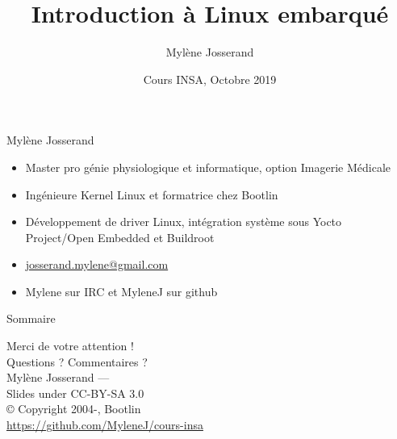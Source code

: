 \documentclass[aspectratio=169,obeyspaces,spaces,hyphens,dvipsnames]{beamer}
\title{Introduction à Linux embarqué}
\author[Mylène Josserand]
{Mylène Josserand}
\date[Octobre 2019]
{Cours INSA, Octobre 2019}
\institute[Bootlin]
\begin{document}
\begin{frame}
  \titlepage
\end{frame}

\begin{frame}{Mylène Josserand}
  \begin{itemize}
  \item Master pro génie physiologique et informatique, option Imagerie Médicale
  \item Ingénieure Kernel Linux et formatrice chez Bootlin
  \item Développement de driver Linux, intégration système sous Yocto Project/Open Embedded et Buildroot
  \item \url{josserand.mylene@gmail.com}
  \item Mylene sur IRC et MyleneJ sur github
  \end{itemize}
\end{frame}

\begin{frame}{Sommaire}
  \hspace{5cm}\tableofcontents
\end{frame}




\begin{frame}
  \begin{center}
    \Huge
    Merci de votre attention ! \\
    Questions ? Commentaires ?\\
    \vspace{1cm}
    \large
    Mylène Josserand — \\
    \vspace{1cm}
    Slides under CC-BY-SA 3.0\\
    © Copyright 2004-\the\year, Bootlin\\
    \scriptsize
    \url{https://github.com/MyleneJ/cours-insa}
  \end{center}
\end{frame}
\end{document}
